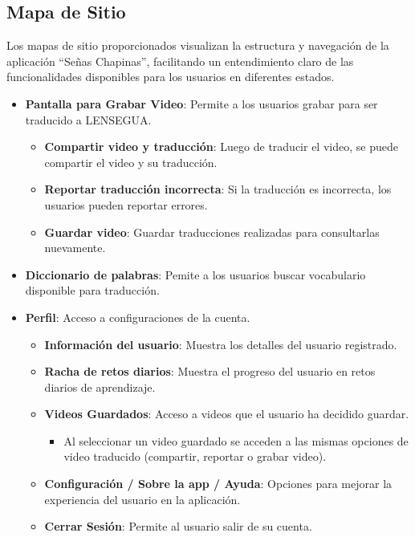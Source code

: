 
\subsection{Mapa de Sitio}

Los mapas de sitio proporcionados visualizan la estructura y navegación de la aplicación ``Señas Chapinas'', facilitando un entendimiento claro de las funcionalidades disponibles para los usuarios en diferentes estados.

\begin{itemize}
    \item \textbf{Pantalla para Grabar Video}: Permite a los usuarios grabar para ser traducido a LENSEGUA. 
    \begin{itemize}
        \item \textbf{Compartir video y traducción}: Luego de traducir el video, se puede compartir el video y su traducción.
        \item \textbf{Reportar traducción incorrecta}: Si la traducción es incorrecta, los usuarios pueden reportar errores.
        \item \textbf{Guardar video}: Guardar traducciones realizadas para consultarlas nuevamente.
    \end{itemize}
    \item \textbf{Diccionario de palabras}: Pemite a los usuarios buscar vocabulario disponible para traducción. 
    
    \item \textbf{Perfil}: Acceso a configuraciones de la cuenta.
    \begin{itemize}
        \item \textbf{Información del usuario}: Muestra los detalles del usuario registrado.
        \item \textbf{Racha de retos diarios}: Muestra el progreso del usuario en retos diarios de aprendizaje.
        \item \textbf{Videos Guardados}: Acceso a videos que el usuario ha decidido guardar.
        \begin{itemize}
            \item Al seleccionar un video guardado se acceden a las mismas opciones de video traducido (compartir, reportar o grabar video).
        \end{itemize}
        \item \textbf{Configuración / Sobre la app / Ayuda}: Opciones para mejorar la experiencia del usuario en la aplicación.
        \item \textbf{Cerrar Sesión}: Permite al usuario salir de su cuenta.
    \end{itemize}
\end{itemize}

